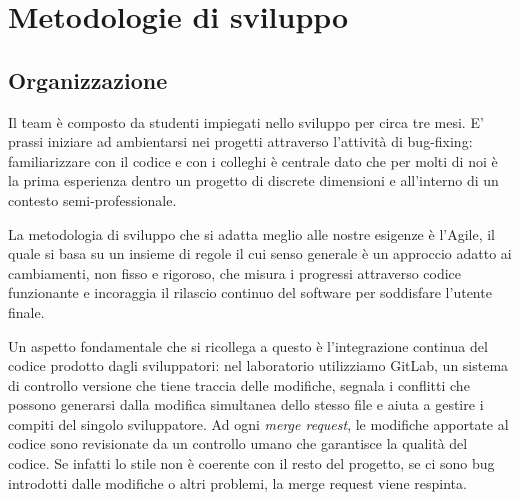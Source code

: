 \documentclass[Lau, oneside]{sapthesis}%
\begin{document}


\chapter{Metodologie di sviluppo}
\label{ch:2}

\section{Organizzazione}
\label{sec:team}
Il team è composto da studenti impiegati nello sviluppo per circa tre mesi. E' prassi iniziare ad ambientarsi nei progetti attraverso
l'attività di bug-fixing: familiarizzare con il codice e con i colleghi è centrale dato che per molti di noi è la prima esperienza
dentro un progetto di discrete dimensioni e all'interno di un contesto semi-professionale.

La metodologia di sviluppo che si adatta meglio alle nostre esigenze è l'Agile, il quale si basa su un insieme di regole il cui senso
generale è un approccio adatto ai cambiamenti, non fisso e rigoroso, che misura i progressi attraverso codice funzionante e incoraggia 
il rilascio continuo del software per soddisfare l'utente finale. 

Un aspetto fondamentale che si ricollega a questo è l'integrazione
continua del codice prodotto dagli sviluppatori: nel laboratorio utilizziamo GitLab, un sistema di controllo versione che tiene
traccia delle modifiche, segnala i conflitti che possono generarsi dalla modifica simultanea dello stesso file e aiuta a gestire i compiti 
del singolo sviluppatore.
Ad ogni \textit{merge request}, le modifiche apportate al codice sono revisionate da un controllo umano che garantisce la qualità del codice.
Se infatti lo stile non è coerente con il resto del progetto, se ci sono bug introdotti dalle modifiche o altri problemi, la merge request 
viene respinta.
\end{document}
